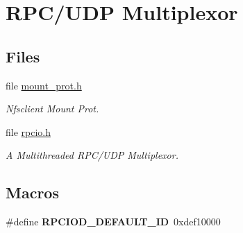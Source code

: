 \hypertarget{group__rtems-nfsclient}{}\section{R\+P\+C/\+U\+DP Multiplexor}
\label{group__rtems-nfsclient}
\subsection*{Files}
\begin{DoxyCompactItemize}
\item 
file \mbox{\hyperlink{mount__prot_8h}{mount\+\_\+prot.\+h}}
\begin{DoxyCompactList}\small\item\em Nfsclient Mount Prot. \end{DoxyCompactList}\item 
file \mbox{\hyperlink{rpcio_8h}{rpcio.\+h}}
\begin{DoxyCompactList}\small\item\em A Multithreaded R\+P\+C/\+U\+DP Multiplexor. \end{DoxyCompactList}\end{DoxyCompactItemize}
\subsection*{Macros}
\begin{DoxyCompactItemize}
\item 
\mbox{\label{group__rtems-nfsclient_gacf02998be14f027d7520c0febdcf440a}} 
\#define {\bfseries R\+P\+C\+I\+O\+D\+\_\+\+D\+E\+F\+A\+U\+L\+T\+\_\+\+ID}~0xdef10000
\end{DoxyCompactItemize}
